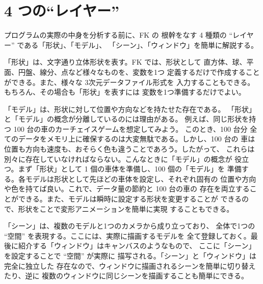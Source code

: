 \section{4 つの``レイヤー''}
プログラムの実際の中身を分析する前に、FK の
根幹をなす 4 種類の ``レイヤー'' である「形状」、「モデル」、
「シーン」、「ウィンドウ」を簡単に解説する。

「形状」は、文字通り立体形状を表す。FK では、形状として
直方体、球、平面、円盤、線分、点など様々なものを、変数を1つ
定義するだけで作成することができる。また、様々な 3次元データファイル形式を
入力することもできる。もちろん、その場合も「形状」を表すには
変数を1つ準備するだけでよい。

「モデル」は、形状に対して位置や方向などを持たせた存在である。
「形状」と「モデル」の概念が分離しているのには理由がある。
例えば、同じ形状を持つ 100 台の車のカーチェイスゲームを想定してみよう。
このとき、100 台分
全てのデータをメモリ上に確保するのは大変無駄である。しかし、100 台の
車は位置も方向も速度も、おそらく色も違うことであろう。したがって、
これらは別々に存在していなければならない。こんなときに「モデル」の概念が
役立つ。まず「形状」として 1 個の車体を準備し、100 個の「モデル」を
準備する。各モデルは形状として先ほどの車体を設定し、それぞれ固有の
位置や方向や色を持てば良い。これで、データ量の節約と 100 台の車の
存在を両立することができる。また、モデルは瞬時に設定する形状を変更することが
できるので、形状をことで変形アニメーションを簡単に実現
することもできる。

「シーン」は、複数のモデルと1つのカメラから成り立っており、
全体で1つの ``空間'' を表現する。ここには、実際に描画するモデルを
全て登録しておく。最後に紹介する「ウィンドウ」はキャンバスのようなもので、
ここに「シーン」を設定することで ``空間'' が実際に
描写される。「シーン」と「ウィンドウ」は完全に独立した
存在なので、ウィンドウに描画されるシーンを簡単に切り替えたり、逆に
複数のウィンドウに同じシーンを描画することも簡単にできる。

